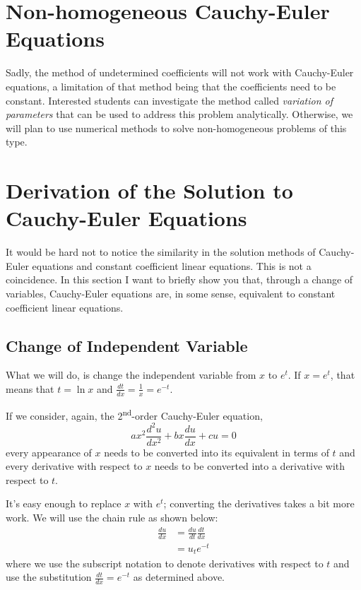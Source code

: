 \begin{enumerate}
\end{enumerate}

\section{Non-homogeneous Cauchy-Euler Equations}
Sadly, the method of undetermined coefficients will not work with Cauchy-Euler equations, a limitation of that method being that the coefficients need to be constant. Interested students can investigate the method called \emph{variation of parameters} that can be used to address this problem analytically.  Otherwise, we will plan to use numerical methods to solve non-homogeneous problems of this type.

\section{Derivation of the Solution to Cauchy-Euler Equations}
It would be hard not to notice the similarity in the solution methods of Cauchy-Euler equations and constant coefficient linear equations.  This is not a coincidence.  In this section I want to briefly show you that, through a change of variables, Cauchy-Euler equations are, in some sense, equivalent to constant coefficient linear equations.

\subsection{Change of Independent Variable}
What we will do, is change the independent variable from $x$ to $e^t$.  If $x = e^t$, that means that $t = \ln{x}$ and $\frac{dt}{dx} = \frac{1}{x} = e^{-t}$.

If we consider, again, the 2\textsuperscript{nd}-order Cauchy-Euler equation,
\begin{equation*}
ax^2\frac{d^2u}{dx^2}+bx\frac{du}{dx}+cu = 0
\end{equation*}
every appearance of $x$ needs to be converted into its equivalent in terms of $t$ and every derivative with respect to $x$ needs to be converted into a derivative with respect to $t$.

It's easy enough to replace $x$ with $e^t$; converting the derivatives takes a bit more work.  We will use the chain rule as shown below:
\begin{align*}
\frac{du}{dx} &= \frac{du}{dt} \frac{dt}{dx} \\
&=u_t e^{-t}
\end{align*}
where we use the subscript notation to denote derivatives with respect to $t$ and use the substitution $\frac{dt}{dx}=e^{-t}$ as determined above.

